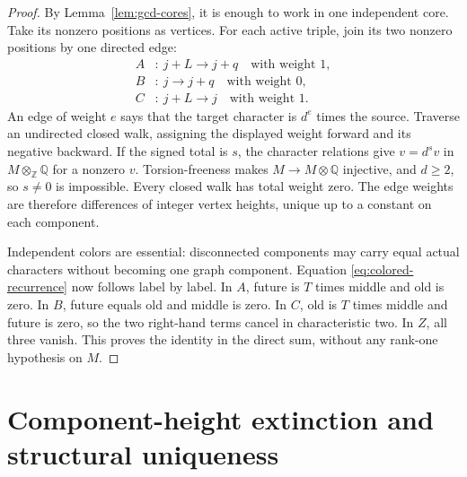 \documentclass[11pt]{article}
\newcommand{\Z}{\mathbb{Z}}
\newcommand{\Q}{\mathbb{Q}}
\theoremstyle{remark}
\numberwithin{equation}{section}
\begin{document}
\begin{proof}
By Lemma~\ref{lem:gcd-cores}, it is enough to work in one independent core.  Take its nonzero positions as vertices.  For each active triple, join its two nonzero positions by one directed edge:
\[
 \begin{aligned}
 A&:\ j+L\longrightarrow j+q\quad\text{with weight }1,\\
 B&:\ j\longrightarrow j+q\quad\text{with weight }0,\\
 C&:\ j+L\longrightarrow j\quad\text{with weight }1.
 \end{aligned}
\]
An edge of weight \(e\) says that the target character is \(d^e\) times the source.  Traverse an undirected closed walk, assigning the displayed weight forward and its negative backward.  If the signed total is \(s\), the character relations give \(v=d^s v\) in \(M\otimes_\Z\Q\) for a nonzero \(v\).  Torsion-freeness makes \(M\to M\otimes\Q\) injective, and \(d\geq2\), so \(s\neq0\) is impossible.  Every closed walk has total weight zero.  The edge weights are therefore differences of integer vertex heights, unique up to a constant on each component.

Independent colors are essential: disconnected components may carry equal actual characters without becoming one graph component.  Equation \eqref{eq:colored-recurrence} now follows label by label.  In \(A\), future is \(T\) times middle and old is zero.  In \(B\), future equals old and middle is zero.  In \(C\), old is \(T\) times middle and future is zero, so the two right-hand terms cancel in characteristic two.  In \(Z\), all three vanish.  This proves the identity in the direct sum, without any rank-one hypothesis on \(M\).
\end{proof}


\section{Component-height extinction and structural uniqueness}\label{sec:component-extinction}
\end{document}

